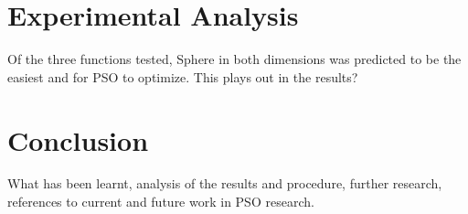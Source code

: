\documentclass{csfourzero}
\begin{document}


\section{Experimental Analysis}


Of the three functions tested, Sphere in both dimensions was predicted to be the
easiest and for PSO to optimize. This plays out in the results?



\section{Conclusion}

What has been learnt, analysis of the results and procedure, further research,
references to current and future work in PSO research.


\end{document}
